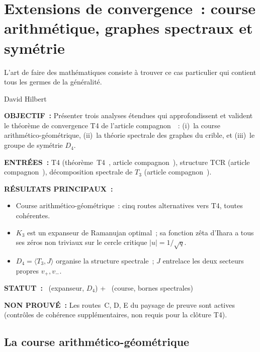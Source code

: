 \documentclass[12pt,a4paper]{article}
\begin{document}
\newpage

\section{Extensions de convergence~: course arithmétique, graphes spectraux et symétrie}
\label{sec:convergence_ext}

\epigraph{L'art de faire des mathématiques consiste à trouver ce cas
particulier qui contient tous les germes de la généralité.}{David
Hilbert}

\begin{statusbox}
\textbf{OBJECTIF~:}
  Présenter trois analyses étendues qui approfondissent et valident le
  théorème de convergence T4 de l'article
  compagnon~\cite{companion_M3}~: (i)~la course
  arithmético-géométrique, (ii)~la théorie spectrale des graphes du
  crible, et (iii)~le groupe de symétrie $D_4$.

\textbf{ENTRÉES~:}
  T4 (théorème~T4~\cite{companion_M3}, article
  compagnon~\cite{companion_M3}), structure TCR (article
  compagnon~\cite{companion_M1}), décomposition spectrale de $T_3$
  (article compagnon~\cite{companion_M3}).

\textbf{RÉSULTATS PRINCIPAUX~:}
  \begin{itemize}[nosep]
  \item Course arithmético-géométrique~: cinq routes alternatives vers
    T4, toutes cohérentes.
  \item $K_3$ est un expanseur de Ramanujan optimal~; sa fonction zêta
    d'Ihara a tous ses zéros non triviaux sur le cercle critique
    $|u| = 1/\sqrt{q}$.
  \item $D_4 = \langle T_3, J \rangle$ organise la structure
    spectrale~; $J$ entrelace les deux secteurs propres
    $v_+, v_-$.
  \end{itemize}

\textbf{STATUT~:}
  \THMTAG~(expanseur, $D_4$) + \VALTAG~(course, bornes spectrales)

\textbf{NON PROUVÉ~:}
  Les routes~C, D, E du paysage de preuve sont actives (contrôles de
  cohérence supplémentaires, non requis pour la clôture T4).
\end{statusbox}

\subsection{La course arithmético-géométrique}
\label{sec:ch7b_race}
\end{document}
